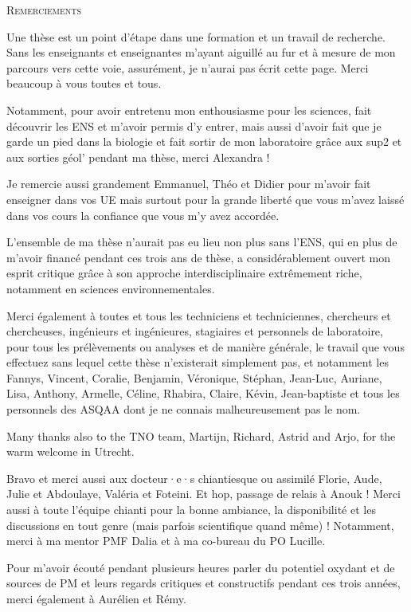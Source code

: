 \begin{center}
    \Huge\textsc{Remerciements}
\end{center}

Une thèse est un point d'étape dans une formation et un travail de recherche.
Sans les enseignants et enseignantes m'ayant aiguillé au fur et à mesure de mon parcours
vers cette voie, assurément, je n'aurai pas écrit cette page. Merci beaucoup à vous
toutes et tous.

Notamment, pour avoir entretenu mon enthousiasme pour les sciences, fait découvrir les ENS
et m'avoir permis d'y entrer, mais aussi d'avoir fait que je garde un pied dans la
biologie et fait sortir de mon laboratoire grâce aux sup2 et aux sorties géol' pendant
ma thèse, merci Alexandra !

Je remercie aussi grandement Emmanuel, Théo et Didier pour m'avoir fait enseigner
dans vos UE mais surtout pour la grande liberté que vous m'avez laissé dans vos cours la
confiance que vous m'y avez accordée.

L'ensemble de ma thèse n'aurait pas eu lieu non plus sans l'ENS, qui en plus de m'avoir
financé pendant ces trois ans de thèse, a considérablement ouvert mon esprit critique
grâce à son approche interdisciplinaire extrêmement riche, notamment en sciences
environnementales.

Merci également à toutes et tous les techniciens et techniciennes, chercheurs et
chercheuses, ingénieurs et ingénieures, stagiaires et personnels de laboratoire, pour
tous les prélèvements ou analyses et de
manière générale, le travail que vous effectuez sans lequel cette thèse n'existerait
simplement pas, et notamment les Fannys, Vincent, Coralie, Benjamin, Véronique, Stéphan, Jean-Luc,
Auriane, Lisa, Anthony, Armelle, Céline, Rhabira, Claire, Kévin, Jean-baptiste et tous
les personnels des ASQAA dont je ne connais malheureusement pas le nom.

Many thanks also to the TNO team, Martijn, Richard, Astrid and Arjo, for the warm welcome
in Utrecht.

Bravo et merci aussi aux docteur·e·s chiantiesque ou assimilé Florie, Aude, Julie et
Abdoulaye, Valéria et Foteini. Et hop, passage de relais à Anouk !
Merci aussi à toute l'équipe chianti pour la bonne ambiance, la disponibilité et
les discussions en tout genre (mais parfois scientifique quand même) !
Notamment, merci à ma mentor PMF Dalia et à ma co-bureau du PO Lucille.

Pour m'avoir écouté pendant plusieurs heures parler du potentiel oxydant et de sources
de PM et leurs regards critiques et constructifs pendant ces trois années, merci
également à Aurélien et Rémy.

